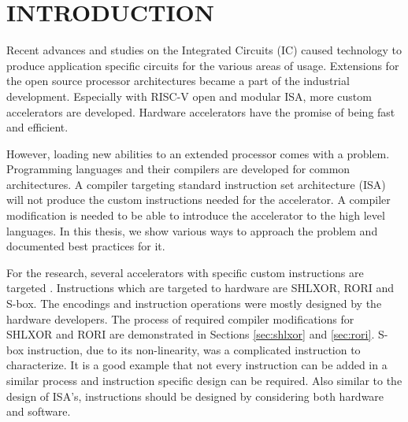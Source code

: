 \chapter{INTRODUCTION}\label{Ch1}

Recent advances and studies on the Integrated Circuits (IC) caused technology to produce application specific circuits for the various areas of usage. Extensions for the open source processor architectures became a part of the industrial development. Especially with RISC-V open and modular ISA, more custom accelerators are developed. Hardware accelerators have the promise of being fast and efficient.

However, loading new abilities to an extended processor comes with a problem. Programming languages and their compilers are developed for common architectures. A compiler targeting standard instruction set architecture (ISA) will not produce the custom instructions needed for the accelerator. A compiler modification is needed to be able to introduce the accelerator to the high level languages. In this thesis, we show various ways to approach the problem and documented best practices for it. 


For the research, several accelerators with specific custom instructions are targeted \cite{Sairoglu, eryilmaz}. Instructions which are targeted to hardware are SHLXOR, RORI and S-box. The encodings and instruction operations were mostly designed by the hardware developers. The process of required compiler modifications for SHLXOR and RORI are demonstrated in Sections \ref{sec:shlxor} and \ref{sec:rori}. S-box instruction, due to its non-linearity, was a complicated instruction to characterize. It is a good example that not every instruction can be added in a similar process and instruction specific design can be required. 
Also similar to the design of ISA's, instructions should be designed by considering both hardware and software. 

